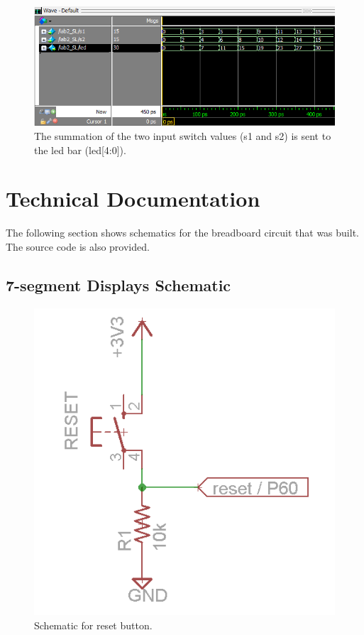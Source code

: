 \documentclass[11pt]{article}
\begin{document}
\begin{figure}[h!]
\centering
\includegraphics[scale=1]{sum.png}
\caption{The summation of the two input switch values (s1 and s2) is sent to the led bar (led[4:0]).}
\label{fig:wave_sum}
\end{figure}


\clearpage

\section{Technical Documentation}

The following section shows schematics for the breadboard circuit that was built. The source code is also provided.

\subsection{7-segment Displays Schematic}


\begin{figure}[h!]
\centering
\includegraphics[scale=0.54]{reset.png}
\caption{Schematic for reset button.}
\label{fig:reset_sch}
\end{figure} 
\end{document}
